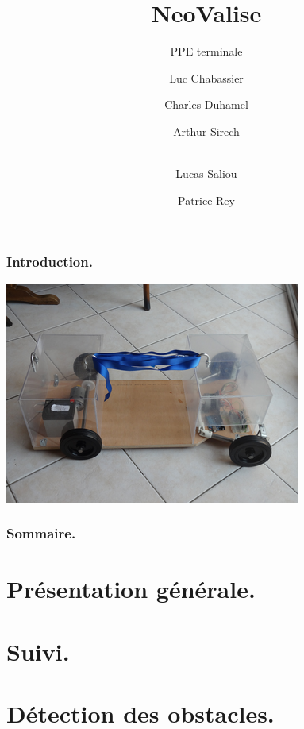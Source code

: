 \documentclass{beamer}
\title{NeoValise}
\subtitle{PPE terminale}
\author[Luc \and Charles \and Arthur \and Lucas \and Patrice]{Luc Chabassier \and Charles Duhamel \and Arthur Sirech \and\\ Lucas Saliou \and Patrice Rey}
\institute{Lycée Pierre de Fermat}
\begin{document}
\begin{frame}
	\maketitle
\end{frame}

\begin{frame}
	\frametitle{Introduction.}
    \begin{center}
        \includegraphics[width=0.95\linewidth]{rcs/intro.png}
    \end{center}
\end{frame}

\begin{frame}
	\frametitle{Sommaire.}
	\tableofcontents
\end{frame}

\section{Présentation générale.}


\section{Suivi.}


\section{Détection des obstacles.}

\end{document}
